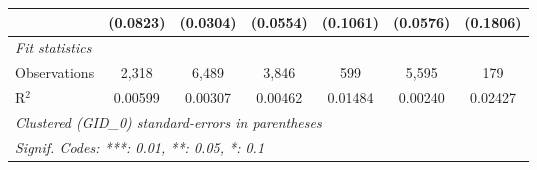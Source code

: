 \begin{table}[htbp]
\begin{tabular}{lcccccc}
                                         & (0.0823)    & (0.0304)       & (0.0554)       & (0.1061)       & (0.0576)       & (0.1806)\\   
      \midrule
      \emph{Fit statistics}\\
      Observations                       & 2,318       & 6,489          & 3,846          & 599            & 5,595          & 179\\  
      R$^2$                              & 0.00599     & 0.00307        & 0.00462        & 0.01484        & 0.00240        & 0.02427\\  
      \midrule \midrule
      \multicolumn{7}{l}{\emph{Clustered (GID\_0) standard-errors in parentheses}}\\
      \multicolumn{7}{l}{\emph{Signif. Codes: ***: 0.01, **: 0.05, *: 0.1}}\\
   \end{tabular}
\end{table}




